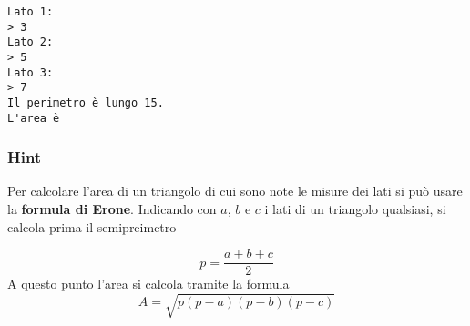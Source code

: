 \documentclass[
]{book}
\begin{document}
\begin{verbatim}
Lato 1:
> 3
Lato 2:
> 5
Lato 3:
> 7
Il perimetro è lungo 15.
L'area è 
\end{verbatim}

\hypertarget{hint}{%
\subsubsection*{Hint}\label{hint}}

Per calcolare l'area di un triangolo di cui sono note le misure dei lati si può usare la \textbf{formula di Erone}. Indicando con \(a\), \(b\) e \(c\) i lati di un triangolo qualsiasi, si calcola prima il semipreimetro

\[
p = \frac{a+b+c}{2}
\]
A questo punto l'area si calcola tramite la formula
\[
A = \sqrt{p(p-a)(p-b)(p-c)}
\]

  
\end{document}
